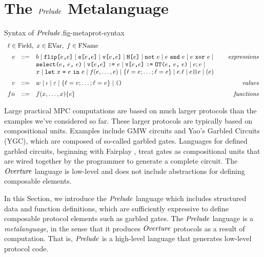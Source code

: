 \section{The $\mathit{Prelude}$ Metalanguage}
\label{section-metalang}

\begin{fpfig}[t]{Syntax of $\mathit{Prelude}$.}{fig-metaprot-syntax}
  {\small
    $$
    \begin{array}{rcl@{\hspace{8mm}}r}
      \multicolumn{3}{l}{\flab \in \mathrm{Field},\   x \in \mathrm{EVar}, \  f \in \mathrm{FName}}\\[2mm]
      e &::=& b \mid \flip{e}{e} \mid \secret{e}{e} \mid \view{e}{e} \mid \oracle{e} \mid \enot\ e \mid e\ \eand\ e \mid e\ \exor\ e \mid & \textit{expressions}\\[0mm]
      & & \select{e}{e}{e} \mid 
      \send{\view{e}{e}}{e} \mid \send{\view{e}{e}}{\OT{e}{e}{e}} \mid e;e \mid \\[0mm]
      & & x \mid \elet{x}{e}{e} \mid f(e,\ldots,e) \mid \{ \flab = e; \ldots; \flab = e \}
      \mid e.\flab \mid e\concat e \mid (e) \\[2mm]
      v &::=& w \mid \cid \mid \be \mid \{ \flab = v;\ldots;\flab = v \} 
      \mid \ttt{()} & \textit{values}\\[2mm]
           {fn} &::=& f(x,\ldots,x) \{ e \} & \textit{functions}
    \end{array}
    $$
  }
\end{fpfig}

Large practical MPC computations are based on much larger protocols
than the examples we've considered so far. These larger protocols are
typically based on compositional units. Examples include GMW circuits
and Yao's Garbled Circuits (YGC), which are composed of so-called
garbled gates.  Languages for defined garbled circuits, beginning with
Fairplay \cite{269581}, treat gates as compositional units that are
wired together by the programmer to generate a complete circuit. The
$\mathit{Overture}$ language is low-level and does not include abstractions for
defining composable elements.

In this Section, we introduce the $\mathit{Prelude}$ language which includes
structured data and function definitions, which are sufficiently
expressive to define composable protocol elements such as garbled
gates. The $\mathit{Prelude}$ language is a \emph{metalanguage}, in the sense
that it produces $\mathit{Overture}$ protocols as a result of computation. That
is, $\mathit{Prelude}$ is a high-level language that generates low-level
protocol code.

